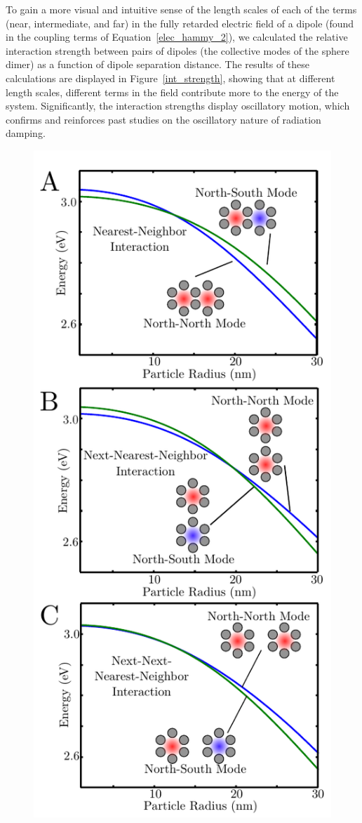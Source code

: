 \documentclass[journal=apchd5,manuscript=article]{achemso}
\begin{document}
To gain a more visual and intuitive sense of the length scales of each of the terms (near, intermediate, and far) in the fully retarded electric field of a dipole (found in the coupling terms of Equation~\ref{elec_hammy_2}), we calculated the relative interaction strength between pairs of dipoles (the collective modes of the sphere dimer) as a function of dipole separation distance. The results of these calculations are displayed in Figure~\ref{int_strength}, showing that at different length scales, different terms in the field contribute more to the energy of the system. Significantly, the interaction strengths display oscillatory motion, which confirms and reinforces past studies on the oscillatory nature of radiation damping.\cite{vonPlessen2007}

\begin{figure}
\begin{center}
\includegraphics{coupling_comparison.pdf}

\end{center}
\end{figure}
\end{document}
